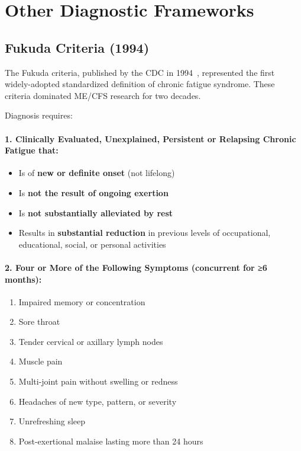 \section{Other Diagnostic Frameworks}
\label{sec:other-criteria}

\subsection{Fukuda Criteria (1994)}

The Fukuda criteria, published by the CDC in 1994~\cite{Fukuda1994}, represented the first widely-adopted standardized definition of chronic fatigue syndrome. These criteria dominated ME/CFS research for two decades.

\begin{requirement}
\label{req:fukuda}
Diagnosis requires:

\paragraph{1. Clinically Evaluated, Unexplained, Persistent or Relapsing Chronic Fatigue that:}
\begin{itemize}
    \item Is of \textbf{new or definite onset} (not lifelong)
    \item Is \textbf{not the result of ongoing exertion}
    \item Is \textbf{not substantially alleviated by rest}
    \item Results in \textbf{substantial reduction} in previous levels of occupational, educational, social, or personal activities
\end{itemize}

\paragraph{2. Four or More of the Following Symptoms (concurrent for ≥6 months):}
\begin{enumerate}
    \item Impaired memory or concentration
    \item Sore throat
    \item Tender cervical or axillary lymph nodes
    \item Muscle pain
    \item Multi-joint pain without swelling or redness
    \item Headaches of new type, pattern, or severity
    \item Unrefreshing sleep
    \item Post-exertional malaise lasting more than 24 hours
\end{enumerate}
\end{requirement}


